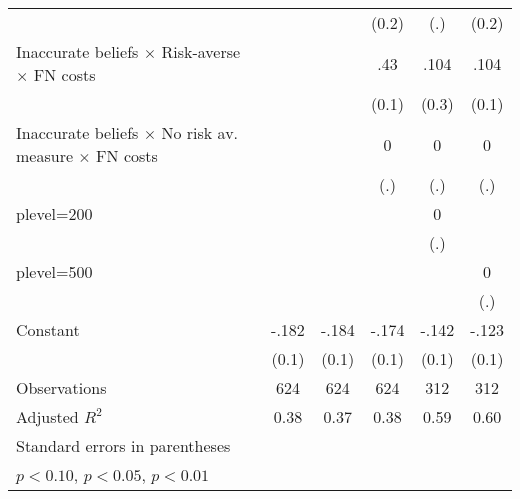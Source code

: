\begin{table}[htbp]
\begin{tabular}{l*{5}{c}}
                &                  &                  &    (0.2)         &      (.)         &    (0.2)         \\
Inaccurate beliefs $\times$ Risk-averse $\times$ FN costs&                  &                  &      .43\sym{***}&     .104         &     .104         \\
                &                  &                  &    (0.1)         &    (0.3)         &    (0.1)         \\
Inaccurate beliefs $\times$ No risk av. measure $\times$ FN costs&                  &                  &        0         &        0         &        0         \\
                &                  &                  &      (.)         &      (.)         &      (.)         \\
plevel=200      &                  &                  &                  &        0         &                  \\
                &                  &                  &                  &      (.)         &                  \\
plevel=500      &                  &                  &                  &                  &        0         \\
                &                  &                  &                  &                  &      (.)         \\
Constant        &    -.182\sym{**} &    -.184\sym{**} &    -.174\sym{**} &    -.142\sym{*}  &    -.123         \\
                &    (0.1)         &    (0.1)         &    (0.1)         &    (0.1)         &    (0.1)         \\
\hline
Observations    &      624         &      624         &      624         &      312         &      312         \\
Adjusted \(R^{2}\)&     0.38         &     0.37         &     0.38         &     0.59         &     0.60         \\
\hline\hline
\multicolumn{6}{l}{\footnotesize Standard errors in parentheses}\\
\multicolumn{6}{l}{\footnotesize \sym{*} \(p<0.10\), \sym{**} \(p<0.05\), \sym{***} \(p<0.01\)}\\
\end{tabular}
\end{table}
